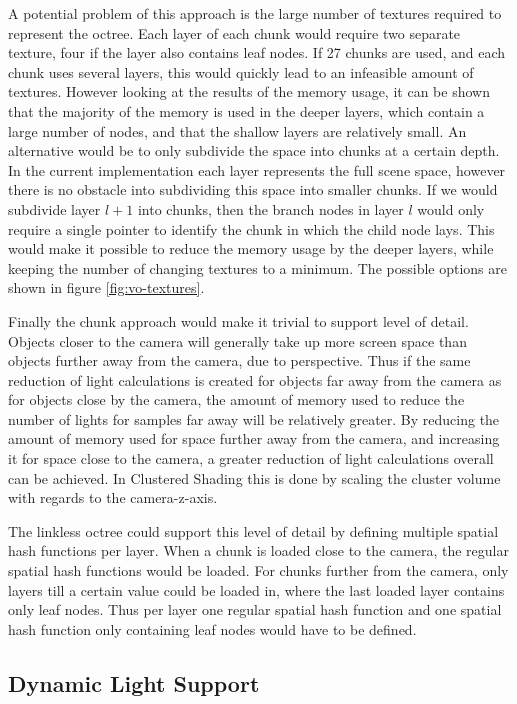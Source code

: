 A potential problem of this approach is the large number of textures required to represent
the octree. Each layer of each chunk would require two separate texture, four if the layer
also contains leaf nodes. If 27 chunks are used, and each chunk uses several layers, this
would quickly lead to an infeasible amount of textures. However looking at the results of
the memory usage, it can be shown that the majority of the memory is used in the deeper
layers, which contain a large number of nodes, and that the shallow layers are relatively
small. An alternative would be to only subdivide the space into chunks at a certain depth.
In the current implementation each layer represents the full scene space, however there is
no obstacle into subdividing this space into smaller chunks. If we would subdivide layer $l + 1$
into chunks, then the branch nodes in layer $l$ would only require a single pointer to identify
the chunk in which the child node lays. This would make it possible to reduce the memory usage
by the deeper layers, while keeping the number of changing textures to a minimum.
The possible options are shown in figure \ref{fig:vo-textures}.

Finally the chunk approach would make it trivial to support level of detail. Objects closer
to the camera will generally take up more screen space than objects further away from the camera,
due to perspective. Thus if the same reduction of light calculations is created for objects
far away from the camera as for objects close by the camera, the amount of memory used to reduce
the number of lights for samples far away will be relatively greater. By reducing the amount of
memory used for space further away from the camera, and increasing it for space close to the
camera, a greater reduction of light calculations overall can be achieved. In Clustered
Shading this is done by scaling the cluster volume with regards to the camera-z-axis.

The linkless octree could support this level of detail by defining multiple spatial hash functions
per layer. When a chunk is loaded close to the camera, the regular spatial hash functions would
be loaded. For chunks further from the camera, only layers till a certain value could be loaded
in, where the last loaded layer contains only leaf nodes. Thus per layer one regular spatial hash function
and one spatial hash function only containing leaf nodes would have to be defined.

\subsection{Dynamic Light Support}


